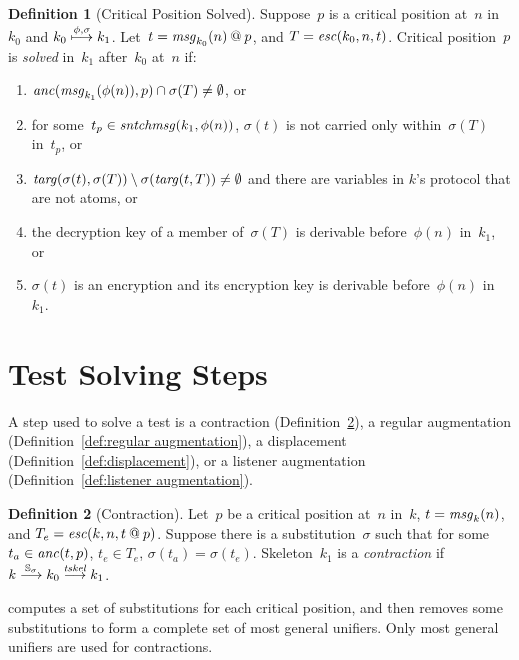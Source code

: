 \documentclass[12pt]{report}
\theoremstyle{definition}
\newtheorem{defn}{Definition}[chapter]
\newcommand{\sntchmsg}{\fn{sntchmsg}}
\newcommand{\msg}{\fn{msg}}
\begin{document}
\begin{defn}[Critical Position Solved]\label{def:critical position solved}
Suppose~$p$ is a critical position at~$n$ in~$k_0$ and
$k_0\stackrel{\phi,\sigma}{\longmapsto}k_1$.  Let~$t=\msg_{k_0}(n)\termat p$,
 and $T=\operatorname{\mathit{esc}}(k_0,n,t)$.  Critical position~$p$ is
\emph{solved} in~$k_1$ after~$k_0$
at~$n$ if:
\begin{enumerate}
\item\label{item:anc}
  $\fn{anc}(\msg_{k_1}(\phi(n)),p)\cap\sigma(T)\neq\emptyset$, or
\item\label{item:aug} for some~$t_p\in\sntchmsg(k_1,\phi(n))$,
  $\sigma(t)$ is not carried only within~$\sigma(T)$ in~$t_p$, or
\item\label{item:targs}
  $\operatorname{\mathit{targ}}(\sigma(t),\sigma(T))\setminus\sigma(\operatorname{\mathit{targ}}(t,T))\neq\emptyset$
  and there are variables in $k$'s protocol that are not atoms, or
\item\label{item:dec} the decryption key of a member of~$\sigma(T)$ is
  derivable before~$\phi(n)$ in~$k_1$, or
\item\label{item:enc} $\sigma(t)$ is an encryption and its encryption
  key is derivable before~$\phi(n)$ in~$k_1$.
\end{enumerate}
\end{defn}

\section{Test Solving Steps}

A step used to solve a test is a contraction
(Definition~\ref{def:contraction}), a regular augmentation
(Definition~\ref{def:regular augmentation}), a displacement
(Definition~\ref{def:displacement}), or a listener augmentation
(Definition~\ref{def:listener augmentation}).

\begin{defn}[Contraction]\label{def:contraction}
Let~$p$ be a critical position
at~$n$ in~$k$, $t=\msg_k(n)$, and $T_e= \operatorname{\mathit{esc}}(k,n,t\mathbin{@} p)$.
Suppose there is a substitution~$\sigma$ such that for
some~$t_a\in\operatorname{\mathit{anc}}(t,p)$, $t_e\in T_e$, $\sigma(t_a)=\sigma(t_e)$.
Skeleton~$k_1$ is a \emph{contraction} if
$k\stackrel{\mathbb S_\sigma}{\longrightarrow}k_0\stackrel{\operatorname{\mathit{tskel}}}{\longrightarrow}k_1$.
\end{defn}

{\cpsa} computes a set of substitutions for each critical position, and
then removes some substitutions to form a complete set of most
general unifiers.  Only most general unifiers are used for
contractions.
\end{document}
